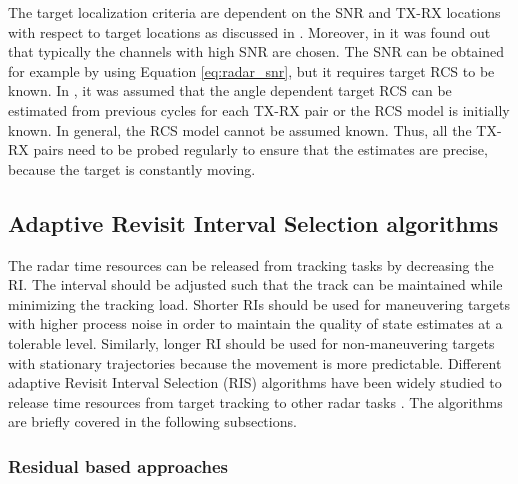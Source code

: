 \documentclass[english, 12pt, a4paper, elec, utf8, a-1b, online]{aaltothesis}
\begin{document}
The target localization criteria are dependent on the SNR and TX-RX locations with respect to target locations as discussed in \cite{Sun2014}.
Moreover, in \cite{Sun2014} it was found out that typically the channels with high SNR are chosen.
The SNR can be obtained for example by using Equation \eqref{eq:radar_snr}, but it requires target RCS to be known.
In \cite{Godrich2011a, Godrich2011, Sun2014}, it was assumed that the angle dependent target RCS can be estimated from previous cycles for each TX-RX pair or the RCS model is initially known.
In general, the RCS model cannot be assumed known. 
Thus, all the TX-RX pairs need to be probed regularly to ensure that the estimates are precise, because the target is constantly moving.


\subsection{Adaptive Revisit Interval Selection algorithms} \label{sec:tbm_ri}

The radar time resources can be released from tracking tasks by decreasing the RI. 
The interval should be adjusted such that the track can be maintained while minimizing the tracking load.
Shorter RIs should be used for maneuvering targets with higher process noise in order to maintain the quality of state estimates at a tolerable level. 
Similarly, longer RI should be used for non-maneuvering targets with stationary trajectories because the movement is more predictable.
Different adaptive Revisit Interval Selection (RIS) algorithms have been widely studied to release time resources from target tracking to other radar tasks \cite{Cohen1986, Gardner1988, Munu1992, ChengTing2007, Baek2010, Watson1993, Charlish2015, Keuk1975, Shin1995, Benoudnine2006, Esfahani2012, Zamani2017, Christiansen2018, Pilte2018}.
The algorithms are briefly covered in the following subsections.

\subsubsection{Residual based approaches}
\end{document}
